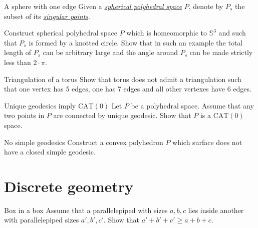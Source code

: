 \documentclass[twoside]{book}
\begin{document}
{\begin{pr}{\hard}{A sphere with one edge}\label{panov-S^3} 
Given  a \hyperref[Polyhedral space]{\emph{spherical polyhedral space}} $P$,
denote by $P_s$ the subset of its 
\hyperref[Polyhedral space]{\emph{singular points}}.

Construct spherical polyhedral space $P$ which is homeomorphic to $\mathbb{S}^3$ and such that $P_s$ is formed by a knotted circle.
Show that in such an example the total length of $P_s$ can be arbitrary large and the angle around $P_s$ can be made strictly less than $2\cdot\pi$.
\end{pr}

\begin{pr}{}{Triangulation of a torus}\label{Triangulation of a torus}
Show that torus does not admit a triangulation 
such that one vertex has 5 edges,
one has 7 edges and 
all other vertexes have 
6 edges. 
\end{pr}

\begin{pr}{\easy}{Unique geodesics imply $\mathrm{CAT}(0)$}\label{Unique geodesics imply CAT}
Let $P$ be a polyhedral space.
Assume that any two points in $P$ 
are connected by unique geodesic.
Show that $P$ is a $\mathrm{CAT}(0)$ space.
\end{pr}

\begin{pr}{\easy}{No simple geodesics}\label{No simple geodesics}
Construct a convex polyhedron $P$ which surface 
does not have a closed simple geodesic.
\end{pr}





\chapter{Discrete geometry}



\begin{pr}{}{Box in a box}\label{box-in-box} 
Assume that a parallelepiped with sizes $a,b,c$ 
lies inside another with parallelepiped sizes $a',b',c'$. 
Show that $a'+b'+c'\ge a+b+c$.
\end{pr}

}
\end{document}
